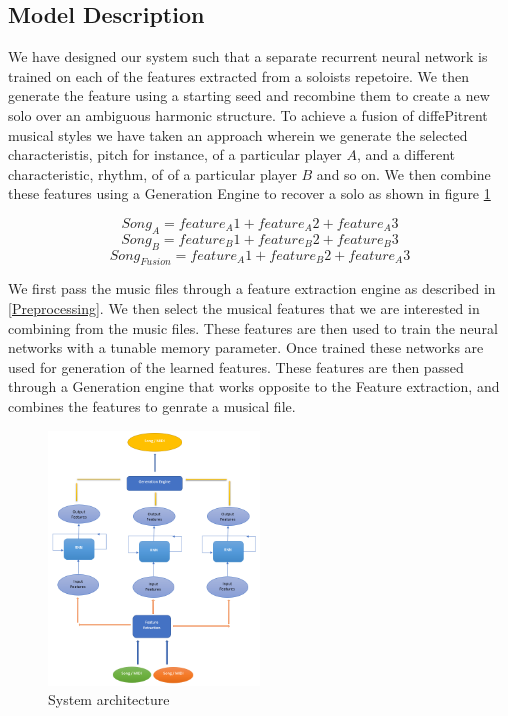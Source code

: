 \documentclass[conference]{IEEEtran}
\begin{document}
\subsection{Model Description} \label{Model description}
We have designed our system such that a separate recurrent neural network is trained on each of the features extracted from a soloists repetoire. We then generate the feature using a starting seed and recombine them to create a new solo over an ambiguous harmonic structure. To achieve a fusion of diffePitrent musical styles we have taken an approach wherein we generate the selected characteristis, pitch for instance, of a particular player $A$, and a different characteristic, rhythm, of of a particular player $B$ and so on. We then combine these features using a Generation Engine to recover a solo as shown in figure \ref{fig:figure9}

$$ Song_A = feature_A{1} + feature_A{2} + feature_A{3}$$
$$ Song_B = feature_B{1} + feature_B{2} + feature_B{3}$$
$$ Song_{Fusion} = feature_A{1} + feature_B{2} + feature_A{3}$$

We first pass the music files through a feature extraction engine as described in \ref{Preprocessing}. We then select the musical features that we are interested in combining from the music files. These features are then used to train the neural networks with a tunable memory parameter. Once trained these networks are used for generation of the learned features. These features are then passed through a Generation engine that works opposite to the Feature extraction, and combines the features to genrate a musical file.

\begin{figure}[h]
\includegraphics[width=0.5\textwidth]{IEEEtran/2.PNG}
\caption{System architecture}
\label{fig:figure9}
\end{figure}
\end{document}

